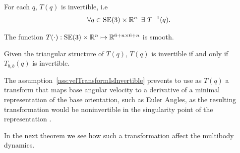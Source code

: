 \begin{assumption}
\label{ass:velTransformIsInvertible}
For each $q$, $T(q)$ is invertible, i.e $$\forall q \in \textrm{SE}(3) \times \mathbb{R}^n \hspace{0.5em} \exists \  T^{-1}(q).$$
\end{assumption}
\begin{assumption}
\label{ass:velTransformIsSmooth}
The function $T(\cdot) : \textrm{SE}(3) \times \mathbb{R}^{n} \mapsto \mathbb{R}^{6+n \times 6+n}$ is smooth.
\end{assumption}
\begin{remark}
Given the triangular structure of $T(q)$, $T(q)$ is invertible if and only if $T_{b,b}(q)$ is invertible. 
\end{remark}
\begin{remark}
The assumption~\ref{ass:velTransformIsInvertible} prevents to use as $T(q)$ a transform that maps base angular velocity to a derivative of a minimal representation of the base orientation, such as Euler Angles, as the resulting transformation would be noninvertible in the singularity point of the representation \citep{stuelpnagel1964}.
\end{remark}

In the next theorem we see how such a transformation affect the multibody dynamics.

